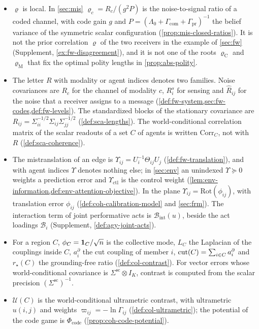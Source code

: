 \begin{itemize}
\item $\varrho$ is local. In \cref{sec:mis} $\varrho_c=R_c/(g^2P)$ is the noise-to-signal ratio of a coded channel, with code gain $g$ and $P=(\Lambda_0+\Gamma_{\mathrm{com}}+\Gamma_{\mathrm{pr}})^{-1}$ the belief variance of the symmetric scalar configuration (\cref{prop:mis-closed-ratios}). It is not the prior correlation $\varrho$ of the two receivers in the example of \cref{sec:fw} (Supplement, \cref{ex:fw-disagreement}), and it is not one of the roots $\varrho_{\mathrm C}$ and $\varrho_{\mathrm M}$ that fix the optimal polity lengths in \cref{prop:abs-polity}.
\item The letter $R$ with modality or agent indices denotes two families. Noise covariances are $R_c$ for the channel of modality $c$, $R^s_i$ for sensing and $\hat R_{ij}$ for the noise that a receiver assigns to a message (\cref{def:fw-system,sec:fw-codes,def:fw-levels}). The standardized blocks of the stationary covariance are $R_{ij}=\Sigma_{ii}^{-1/2}\Sigma_{ij}\Sigma_{jj}^{-1/2}$ (\cref{def:sca-lengths}). The world-conditional correlation matrix of the scalar readouts of a set $C$ of agents is written $\mathrm{Corr}_C$, not with $R$ (\cref{def:sca-coherence}).
\item The mistranslation of an edge is $\Upsilon_{ij}=U_i^{-1}\Theta_{ij}U_j$ (\cref{def:fw-translation}), and with agent indices $\Upsilon$ denotes nothing else; in \cref{sec:env} an unindexed $\Upsilon\succeq0$ weights a prediction error and $\Upsilon_{\mathrm{ctl}}$ is the control weight (\cref{lem:env-information,def:env-attention-objective}). In the plane $\Upsilon_{ij}=\mathrm{Rot}(\phi_{ij})$, with translation error $\phi_{ij}$ (\cref{def:coh-calibration-model} and \cref{sec:frm}). The interaction term of joint performative acts is $\mathcal B_{\mathrm{int}}(u)$, beside the act loadings $\mathcal B_i$ (Supplement, \cref{def:agy-joint-acts}).
\item For a region $C$, $\phi_C=\mathbf{1}_C/\sqrt n$ is the collective mode, $L_C$ the Laplacian of the couplings inside $C$, $a^\partial_i$ the cut coupling of member $i$, $\operatorname{cut}(C)=\sum_{i\in C}a^\partial_i$ and $r_\star(C)$ the grounding-free ratio (\cref{def:col-contrast}). For vector errors whose world-conditional covariance is $\Sigma^{\mathrm{sc}}\otimes I_K$, contrast is computed from the scalar precision $(\Sigma^{\mathrm{sc}})^{-1}$.
\item $\mathcal U(C)$ is the world-conditional ultrametric contrast, with ultrametric $u(i,j)$ and weights $\varpi_{ij}=-\ln\Gamma_{ij}$ (\cref{def:col-ultrametric}); the potential of the code game is $\Phi_{\mathrm{code}}$ (\cref{prop:coh-code-potential}).

\end{itemize}

